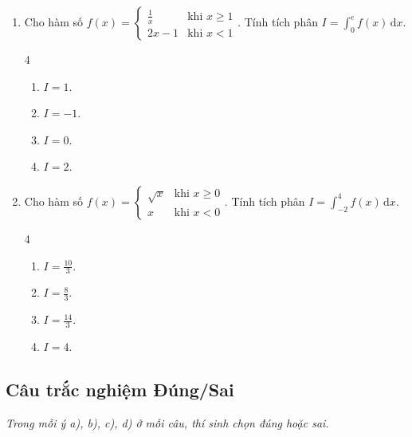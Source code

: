 \documentclass[12pt]{article}
\begin{document}
\begin{enumerate}[label=\textbf{Câu \arabic*.}]
		\item Cho hàm số $f(x) = \begin{cases} \frac{1}{x} & \text{khi } x \ge 1 \\ 2x - 1 & \text{khi } x < 1 \end{cases}$. Tính tích phân $I = \displaystyle \int_{0}^{e} f(x)\,\mathrm{d}x$.
		\begin{multicols}{4}
			\begin{enumerate}[label=\textbf{\Alph*.}]
				\item $I = 1$.
				\item $I = -1$.
				\item $I = 0$.
				\item $I = 2$.
			\end{enumerate}
		\end{multicols}
		
		\item Cho hàm số $f(x) = \begin{cases} \sqrt{x} & \text{khi } x \ge 0 \\ x & \text{khi } x < 0 \end{cases}$. Tính tích phân $I = \displaystyle \int_{-2}^{4} f(x)\,\mathrm{d}x$.
		\begin{multicols}{4}
			\begin{enumerate}[label=\textbf{\Alph*.}]
				\item $I = \frac{10}{3}$.
				\item $I = \frac{8}{3}$.
				\item $I = \frac{14}{3}$.
				\item $I = 4$.
			\end{enumerate}
		\end{multicols}
\end{enumerate}
	
	\subsection{Câu trắc nghiệm Đúng/Sai}
	\textit{Trong mỗi ý a), b), c), d) ở mỗi câu, thí sinh chọn đúng hoặc sai.}
	
\end{document}

